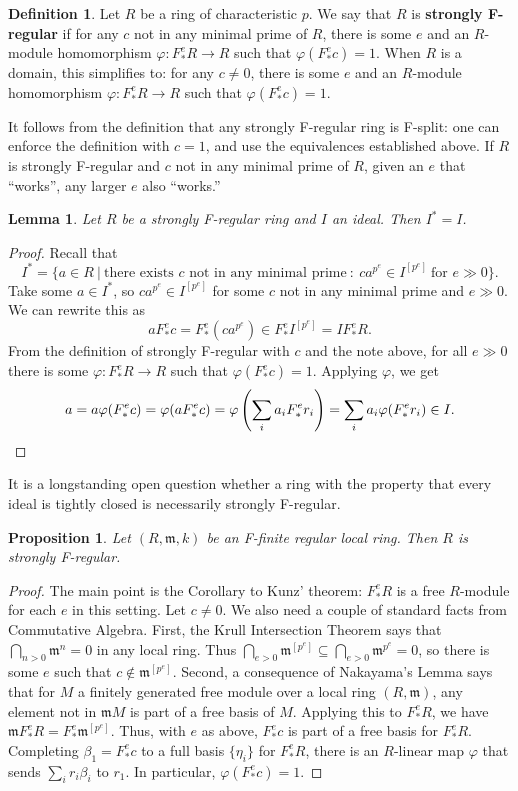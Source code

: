 \documentclass[12pt]{amsart}
\newtheorem{lemma}[theorem]{Lemma}
\newtheorem{proposition}[theorem]{Proposition}
\theoremstyle{definition}
\newtheorem{definition}[theorem]{Definition}
\numberwithin{equation}{theorem}
\def\frakm{\mathfrak{m}}
\def\phi{\varphi}
\def\to{\longrightarrow}
\begin{document}
\begin{definition}
Let $R$ be a ring of characteristic $p$. We say that $R$ is \textbf{strongly F-regular} if for any $c$ not in any minimal prime of $R$, there is some $e$ and an $R$-module homomorphism $\phi: F^e_*R \to R$ such that $\phi(F^e_*c) = 1$.
When $R$ is a domain, this simplifies to: for any $c\neq 0$, there is some $e$ and an $R$-module homomorphism $\phi: F^e_*R \to R$ such that $\phi(F^e_*c) = 1$.
\end{definition}

It follows from the definition that any strongly F-regular ring is F-split: one can enforce the definition with $c=1$, and use the equivalences established above.
If $R$ is strongly F-regular and $c$ not in any minimal prime of $R$, given an $e$ that ``works'', any larger $e$ also ``works.''

\begin{lemma} Let $R$ be a strongly F-regular ring and $I$ an ideal. Then $I^* = I$.
\end{lemma}
\begin{proof} Recall that \[I^*=\{ a\in R \ | \ \text{there exists $c$ not in any minimal prime} \ : \ ca^{p^e}\in I^{[p^e]} \ \text{for $e\gg 0$}\}.\]
 Take some $a\in I^*$, so $ca^{p^e}\in I^{[p^e]}$ for some $c$ not in any minimal prime and $e\gg0$.  We can rewrite this as
 \[ a F^e_* c  = F^e_* (ca^{p^e}) \in F^e_* I^{[p^e]} = I F^e_* R.\]
From the definition of strongly F-regular with $c$ and the note above, for all $e\gg0$ there is some $\phi: F^{e}_* R \to R$ such that $\phi(F^{e}_* c) = 1$. Applying $\phi$, we get
\[ a = a  \phi(F^e_* c) = \phi(a F^e_* c) = \phi\left( \sum_i a_i F^e_* r_i \right) = \sum_i a_i \phi( F^e_* r_i ) \in I. \qedhere\]
\end{proof}

It is a longstanding open question whether a ring with the property that every ideal is tightly closed is necessarily strongly F-regular.

\begin{proposition} Let $(R,\frakm,k)$ be an F-finite regular local ring. Then $R$ is strongly F-regular.
\end{proposition}
\begin{proof}
The main point is the Corollary to Kunz' theorem: $F^e_*R$ is a free $R$-module for each $e$ in this setting. Let $c\neq 0$. We also need a couple of standard facts from Commutative Algebra. First, the Krull Intersection Theorem says that $\bigcap_{n>0} \frakm^n=0$ in any local ring. Thus $\bigcap_{e>0} \frakm^{[p^e]} \subseteq \bigcap_{e>0} \frakm^{p^e} = 0$, so there is some $e$ such that $c\notin \frakm^{[p^e]}$. Second, a consequence of Nakayama's Lemma says that for $M$ a finitely generated free module over a local ring $(R,\frakm)$, any element not in $\frakm M$ is part of a free basis of $M$. Applying this to $F^e_* R$,  we have $\frakm F^e_* R = F^e_* \frakm^{[p^e]}$. Thus, with $e$ as above, $F^e_* c$ is part of a free basis for $F^e_* R$. Completing $\beta_1= F^e_* c$ to a full basis $\{\eta_i\}$ for $F^e_* R$, there is an $R$-linear map $\phi$ that sends $\sum_i r_i \beta_i$ to $r_1$. In particular, $\phi(F^e_* c) = 1$.
\end{proof}
\end{document}
